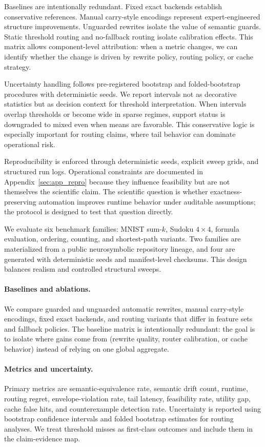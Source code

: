 \documentclass{article} %
\begin{document}
Baselines are intentionally redundant. Fixed exact backends establish conservative references. Manual carry-style encodings represent expert-engineered structure improvements. Unguarded rewrites isolate the value of semantic guards. Static threshold routing and no-fallback routing isolate calibration effects. This matrix allows component-level attribution: when a metric changes, we can identify whether the change is driven by rewrite policy, routing policy, or cache strategy.

Uncertainty handling follows pre-registered bootstrap and folded-bootstrap procedures with deterministic seeds. We report intervals not as decorative statistics but as decision context for threshold interpretation. When intervals overlap thresholds or become wide in sparse regimes, support status is downgraded to mixed even when means are favorable. This conservative logic is especially important for routing claims, where tail behavior can dominate operational risk.

Reproducibility is enforced through deterministic seeds, explicit sweep grids, and structured run logs. Operational constraints are documented in Appendix~\ref{sec:app_repro} because they influence feasibility but are not themselves the scientific claim. The scientific question is whether exactness-preserving automation improves runtime behavior under auditable assumptions; the protocol is designed to test that question directly.

We evaluate six benchmark families: MNIST sum-$k$, Sudoku $4\times4$, formula evaluation, ordering, counting, and shortest-path variants. Two families are materialized from a public neurosymbolic repository lineage, and four are generated with deterministic seeds and manifest-level checksums. This design balances realism and controlled structural sweeps.

\paragraph{Baselines and ablations.}
We compare guarded and unguarded automatic rewrites, manual carry-style encodings, fixed exact backends, and routing variants that differ in feature sets and fallback policies. The baseline matrix is intentionally redundant: the goal is to isolate where gains come from (rewrite quality, router calibration, or cache behavior) instead of relying on one global aggregate.

\paragraph{Metrics and uncertainty.}
Primary metrics are semantic-equivalence rate, semantic drift count, runtime, routing regret, envelope-violation rate, tail latency, feasibility rate, utility gap, cache false hits, and counterexample detection rate. Uncertainty is reported using bootstrap confidence intervals and folded bootstrap estimates for routing analyses. We treat threshold misses as first-class outcomes and include them in the claim-evidence map.
\end{document}
